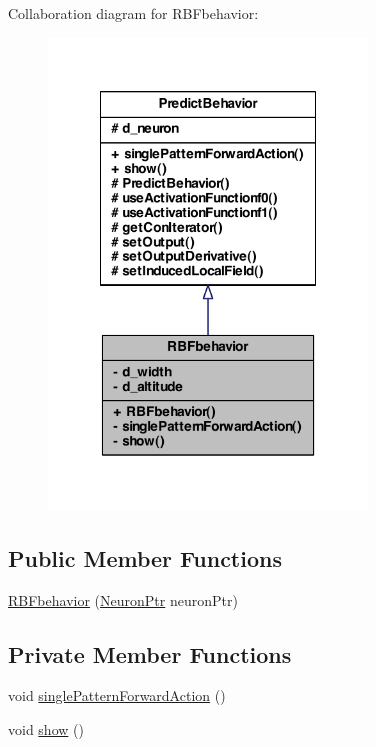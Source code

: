 Collaboration diagram for RBFbehavior:
\nopagebreak
\begin{figure}[H]
\begin{center}
\leavevmode
\includegraphics[width=240pt]{class_r_b_fbehavior__coll__graph}
\end{center}
\end{figure}
\subsection*{Public Member Functions}
\begin{DoxyCompactItemize}
\item 
\hyperlink{class_r_b_fbehavior_a5122dd22cb9a6be24175afc410a82f35}{RBFbehavior} (\hyperlink{_a_m_o_r_e_8h_ac1ea936c2c7728eb382278131652fef4}{NeuronPtr} neuronPtr)
\end{DoxyCompactItemize}
\subsection*{Private Member Functions}
\begin{DoxyCompactItemize}
\item 
void \hyperlink{class_r_b_fbehavior_a65deae9c787617869b92c8a716d510b3}{singlePatternForwardAction} ()
\item 
void \hyperlink{class_r_b_fbehavior_a96b123a5b657e46946c3ff98ea78f5de}{show} ()
\end{DoxyCompactItemize}
